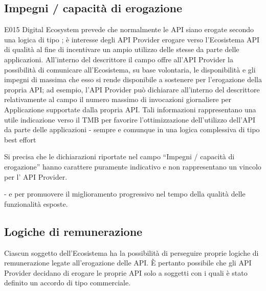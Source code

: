 \documentclass[letterpaper,10pt,italian]{sphinxmanual}
\begin{document}
\subsection{Impegni / capacità di erogazione}
\label{\detokenize{sez25:sezione252}}\label{\detokenize{sez25:impegni-capacita-di-erogazione}}
E015 Digital Ecosystem prevede che normalmente le API siano erogate secondo una logica di tipo ; è interesse degli API Provider erogare verso l’Ecosistema API di qualità al fine di incentivare un ampio utilizzo delle stesse da parte delle applicazioni.
All’interno del descrittore il campo  offre all’API Provider la possibilità di comunicare all’Ecosistema, su base volontaria, le disponibilità e gli impegni di massima che esso si rende disponibile a sostenere per l’erogazione della propria API; ad esempio, l’API Provider può dichiarare all’interno del descrittore \textendash{} relativamente al campo  \textendash{}  il numero massimo di invocazioni giornaliere per Applicazione supportate dalla propria API. Tali informazioni rappresentano una utile indicazione verso il TMB per favorire l’ottimizzazione dell’utilizzo dell’API da parte delle applicazioni - sempre e comunque in una logica complessiva di tipo best effort %
\begin{footnote}[1]\sphinxAtStartFootnote
Si precisa che le dichiarazioni riportate nel campo “Impegni / capacità di erogazione” hanno carattere puramente indicativo e non rappresentano un vincolo per l’ API Provider.
%
\end{footnote} - e per promuovere il miglioramento progressivo nel tempo della qualità delle funzionalità esposte.


\subsection{Logiche di remunerazione}
\label{\detokenize{sez25:sezione253}}\label{\detokenize{sez25:logiche-di-remunerazione}}
Ciascun soggetto dell’Ecosistema ha la possibilità di perseguire proprie logiche di remunerazione legate all’erogazione delle API. È pertanto possibile che gli API Provider decidano di erogare le proprie API solo a soggetti con i quali è stato definito un accordo di tipo commerciale.
\end{document}
